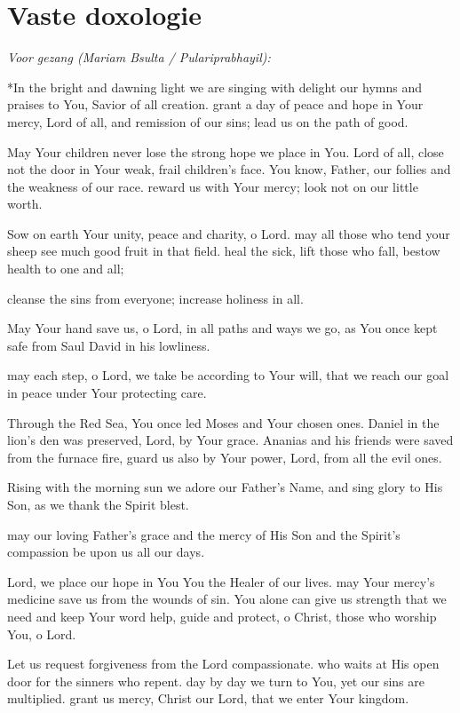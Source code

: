 \documentclass[12pt,twoside,a5paper]{article}
\newcommand{\liturgicalhint}[1]{{\color{BrickRed}\footnotesize\itshape{#1}}}
\newenvironment{triplecols}{%
  \begin{paracol}{3}%
    \setlength{\columnsep}{1.5em}%
}{%
  \end{paracol}%
}
\newcommand{\englishl}{\switchcolumn[0]*\selectlanguage{english}}%
\newcommand{\englishc}[1]{\switchcolumn[#1]\selectlanguage{english}}%
\newcommand{\markedsection}[1]{\section*{#1}\markboth{#1}{}}
\begin{document}

\markedsection{Vaste doxologie}

\liturgicalhint{Voor gezang (Mariam Bsulta / Pulariprabhayil):}

\begin{triplecols}
  \englishl In the bright and dawning light we are singing with delight
  our hymns and praises to You, Savior of all creation. grant a day of peace and hope in Your mercy, Lord of all, and remission of our sins; lead us on the path of good.

  May Your children never lose the strong hope we place in You. Lord of all, close not the door in Your weak, frail children's face. You know, Father, our follies and the weakness of our race. reward us with Your mercy; look not on our little worth.

  Sow on earth Your unity, peace and charity, o Lord. may all those who tend your sheep see much good fruit in that field. heal the sick, lift those who fall, bestow health to one and all;

  \englishc{1} cleanse the sins from everyone; increase holiness in all.

  May Your hand save us, o Lord, in all paths and ways we go, as You once kept safe from Saul David in his lowliness.

  may each step, o Lord, we take be according to Your will, that we reach our goal in peace under Your protecting care.

  Through the Red Sea, You once led Moses and Your chosen ones. Daniel in the lion's den was preserved, Lord, by Your grace. Ananias and his friends
  were saved from the furnace fire, guard us also by Your power, Lord, from all the evil ones.

  Rising with the morning sun we adore our Father's Name, and sing glory to His Son, as we thank the Spirit blest.

  \englishc{2} may our loving Father's grace and the mercy of His Son
  and the Spirit's compassion be upon us all our days.

  Lord, we place our hope in You You the Healer of our lives. may Your mercy's medicine save us from the wounds of sin. You alone can give us strength that we need and keep Your word help, guide and protect, o Christ, those who worship You, o Lord.

  Let us request forgiveness from the Lord compassionate. who waits at His open door for the sinners who repent. day by day we turn to You, yet our sins are multiplied. grant us mercy, Christ our Lord, that we enter Your kingdom.
\end{triplecols}
\end{document}

